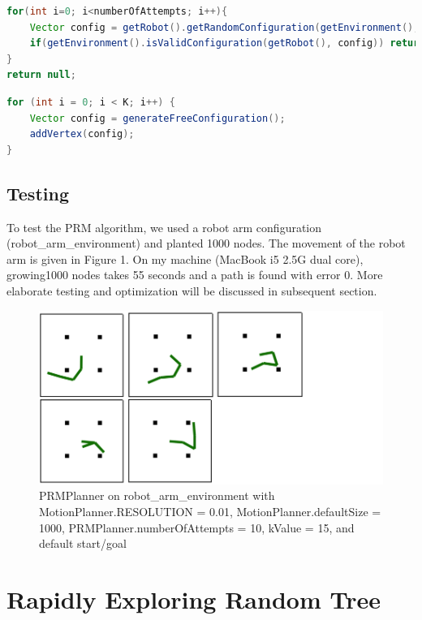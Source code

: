 \documentclass[9.5pt]{extarticle}
\begin{document}
\begin{lstlisting}[language=java,caption={Java code for generateFreeConfiguration}]
for(int i=0; i<numberOfAttempts; i++){
	Vector config = getRobot().getRandomConfiguration(getEnvironment(),random);
	if(getEnvironment().isValidConfiguration(getRobot(), config)) return config;
}
return null;
\end{lstlisting}

\begin{lstlisting}[language=java,caption={Java code for growMap}]
for (int i = 0; i < K; i++) {
	Vector config = generateFreeConfiguration();
	addVertex(config);
}
\end{lstlisting}

\subsection{Testing}

To test the PRM algorithm, we used a robot arm configuration (robot\_arm\_environment) and planted 1000 nodes. The movement of the robot arm is given in Figure 1. On my machine (MacBook i5 2.5G dual core), growing1000 nodes takes 55 seconds and a path is found with error 0. More elaborate testing and optimization will be discussed in subsequent section.

\begin{figure}[H]
\centering
\includegraphics[scale=1]{prm1.png}
\caption{PRMPlanner on robot\_arm\_environment with MotionPlanner.RESOLUTION = 0.01, MotionPlanner.defaultSize = 1000, PRMPlanner.numberOfAttempts = 10, kValue = 15, and default start/goal }
\label{Figure 1}
\end{figure}


\section{Rapidly Exploring Random Tree}
\end{document}
